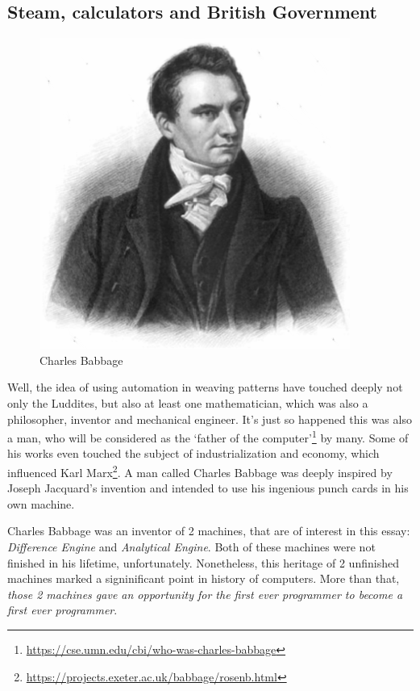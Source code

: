 \documentclass[../../what-is-computer]{subfiles}
\begin{document}
    \subsection{Steam, calculators and British Government}
    \begin{figure}
        \centering
        \includegraphics[scale=0.2]{images/persons/person_charles_babbage.png}
        \caption{Charles Babbage}
    \end{figure}

    Well, the idea of using automation in weaving patterns have touched deeply not only the Luddites, but also at least one mathematician, which was also a philosopher,
    inventor and mechanical engineer. It's just so happened this was also a man, who will be considered as the `father of the computer'\footnote{\href{https://cse.umn.edu/cbi/who-was-charles-babbage}
    {https://cse.umn.edu/cbi/who-was-charles-babbage}} by many. Some of his works even touched the subject of industrialization and economy, which influenced Karl 
    Marx\footnote{\href{https://projects.exeter.ac.uk/babbage/rosenb.html}{https://projects.exeter.ac.uk/babbage/rosenb.html}}. A man called Charles Babbage was deeply
    inspired by Joseph Jacquard's invention and intended to use his ingenious punch cards in his own machine. \par

    Charles Babbage was an inventor of 2 machines, that are of interest in this essay: \emph{Difference Engine} and \emph{Analytical Engine}. Both of these machines
    were not finished in his lifetime, unfortunately. Nonetheless, this heritage of 2 unfinished machines marked a signinificant point in history of computers. More 
    than that, \emph{those 2 machines gave an opportunity for the first ever programmer to become a first ever programmer}. \par
\end{document}
